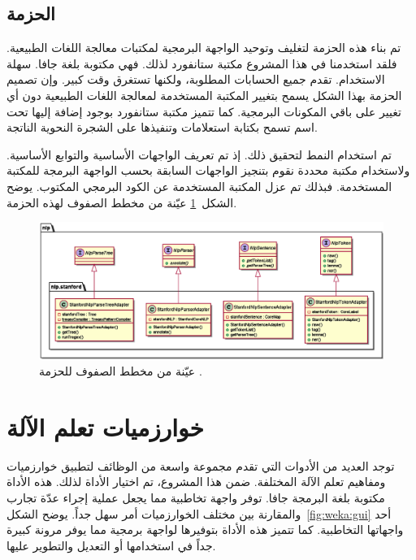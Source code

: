 \subsection{الحزمة }
\label{sec:stanford}
تم بناء هذه الحزمة لتغليف وتوحيد الواجهة البرمجية  لمكتبات معالجة اللغات الطبيعية.
فلقد استخدمنا في هذا المشروع مكتبة ستانفورد
لذلك.
فهي مكتوبة بلغة جافا.
سهلة الاستخدام.
تقدم جميع الحسابات المطلوبة،
ولكنها تستغرق وقت كبير.
وإن تصميم الحزمة  بهذا الشكل يسمح بتغيير المكتبة المستخدمة لمعالجة اللغات الطبيعية دون أي تغيير على باقي المكونات البرمجية.
كما تتميز مكتبة ستانفورد بوجود إضافة إليها تحت اسم 
تسمح بكتابة استعلامات وتنفيذها على الشجرة النحوية الناتجة.

تم استخدام النمط  لتحقيق ذلك.
إذ تم تعريف الواجهات الأساسية والتوابع الأساسية.
ولاستخدام مكتبة محددة نقوم بتنجيز الواجهات السابقة بحسب الواجهة البرمجة  للمكتبة المستخدمة.
فبذلك تم عزل المكتبة المستخدمة عن الكود البرمجي المكتوب.
يوضح الشكل~\ref{fig:cd:nlp} عيّنة من مخطط الصفوف لهذه الحزمة.

\begin{figure}[htb]
	\centering
	\includegraphics[width=1\linewidth]{images/cd-nlp.eps}
	\caption{%
		عيّنة من مخطط الصفوف للحزمة .
	}
	\label{fig:cd:nlp}
\end{figure}

\afterpage{\clearpage}



\section{خوارزميات تعلم الآلة}
\label{sec:weka}
توجد العديد من الأدوات التي تقدم مجموعة واسعة من الوظائف لتطبيق خوارزميات ومفاهيم تعلم الآلة المختلفة.
ضمن هذا المشروع، تم اختيار الأداة
لذلك.
هذه الأداة مكتوبة بلغة البرمجة جافا.
توفر واجهة تخاطبية  مما يجعل عملية إجراء عدّة تجارب والمقارنة بين مختلف الخوارزميات أمر سهل جداً.
يوضح الشكل~\ref{fig:weka:gui} أحد واجهاتها التخاطبية.
كما تتميز هذه الأداة بتوفيرها لواجهة برمجية  مما يوفر مرونة كبيرة جداً في استخدامها أو التعديل والتطوير عليها.

